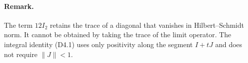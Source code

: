 \paragraph{Remark.}
The term $12I_2$ retains the trace of a diagonal that vanishes
in Hilbert--Schmidt norm. It cannot be obtained by taking the trace of the limit operator.
The integral identity (D4.1) uses only positivity along the segment $I+tJ$
and does not require $\|J\|<1$.
